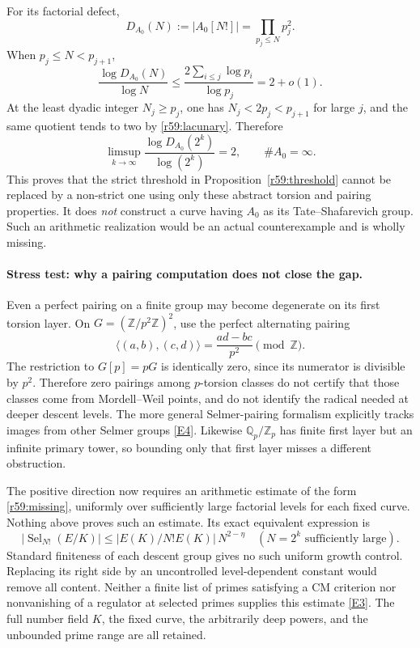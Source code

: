 \documentclass[11pt,a4paper]{article}
\newcommand{\Z}{\mathbb{Z}}
\newcommand{\Q}{\mathbb{Q}}
\newcommand{\eref}[2]{\hyperlink{extra:#1:#2}{[E#2]}}
\numberwithin{equation}{section}
\begin{document}
For its factorial defect,
\begin{equation}\label{r59:toydefect}
 D_{A_0}(N):=|A_0[N!]|=\prod_{p_j\leq N}p_j^2.
\end{equation}
When $p_j\leq N<p_{j+1}$,
\[
 \frac{\log D_{A_0}(N)}{\log N}
 \leq\frac{2\sum_{i\leq j}\log p_i}{\log p_j}=2+o(1).
\]
At the least dyadic integer $N_j\geq p_j$, one has $N_j<2p_j<p_{j+1}$ for large $j$, and the same quotient tends to two by \eqref{r59:lacunary}. Therefore
\begin{equation}\label{r59:sharp}
 \limsup_{k\to\infty}\frac{\log D_{A_0}(2^k)}{\log(2^k)}=2,
 \qquad \#A_0=\infty.
\end{equation}
This proves that the strict threshold in Proposition~\ref{r59:threshold} cannot be replaced by a non-strict one using only these abstract torsion and pairing properties. It does \emph{not} construct a curve having $A_0$ as its Tate--Shafarevich group. Such an arithmetic realization would be an actual counterexample and is wholly missing.

\paragraph{Stress test: why a pairing computation does not close the gap.}
Even a perfect pairing on a finite group may become degenerate on its first torsion layer. On $G=(\Z/p^2\Z)^2$, use the perfect alternating pairing
\[
 \langle(a,b),(c,d)\rangle=\frac{ad-bc}{p^2}\pmod\Z.
\]
The restriction to $G[p]=pG$ is identically zero, since its numerator is divisible by $p^2$. Therefore zero pairings among $p$-torsion classes do not certify that those classes come from Mordell--Weil points, and do not identify the radical needed at deeper descent levels. The more general Selmer-pairing formalism explicitly tracks images from other Selmer groups \eref{statement}{4}. Likewise $\Q_p/\Z_p$ has finite first layer but an infinite primary tower, so bounding only that first layer misses a different obstruction.

The positive direction now requires an arithmetic estimate of the form \eqref{r59:missing}, uniformly over sufficiently large factorial levels for each fixed curve. Nothing above proves such an estimate. Its exact equivalent expression is
\[
 |\operatorname{Sel}_{N!}(E/K)|
       \leq |E(K)/N!E(K)|\,N^{2-\eta}
                 \quad(N=2^k\text{ sufficiently large}).
\]
Standard finiteness of each descent group gives no such uniform growth control. Replacing its right side by an uncontrolled level-dependent constant would remove all content. Neither a finite list of primes satisfying a CM criterion nor nonvanishing of a regulator at selected primes supplies this estimate \eref{statement}{3}. The full number field $K$, the fixed curve, the arbitrarily deep powers, and the unbounded prime range are all retained.
\end{document}
